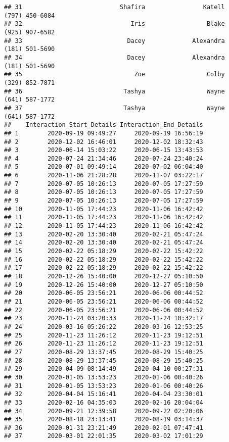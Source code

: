 \documentclass[
]{article}
\begin{document}
\begin{verbatim}
## 31                           Shafira                Katell       (797) 450-6084
## 32                              Iris                 Blake       (925) 907-6582
## 33                             Dacey             Alexandra       (181) 501-5690
## 34                             Dacey             Alexandra       (181) 501-5690
## 35                               Zoe                 Colby       (329) 852-7871
## 36                            Tashya                 Wayne       (641) 587-1772
## 37                            Tashya                 Wayne       (641) 587-1772
##    Interaction_Start_Details Interaction_End_Details
## 1        2020-09-19 09:49:27     2020-09-19 16:56:19
## 2        2020-12-02 16:46:01     2020-12-02 18:32:43
## 3        2020-06-14 15:03:22     2020-06-15 13:43:53
## 4        2020-07-24 21:34:46     2020-07-24 23:40:24
## 5        2020-07-01 09:49:14     2020-07-02 06:04:40
## 6        2020-11-06 21:28:28     2020-11-07 03:22:17
## 7        2020-07-05 10:26:13     2020-07-05 17:27:59
## 8        2020-07-05 10:26:13     2020-07-05 17:27:59
## 9        2020-07-05 10:26:13     2020-07-05 17:27:59
## 10       2020-11-05 17:44:23     2020-11-06 16:42:42
## 11       2020-11-05 17:44:23     2020-11-06 16:42:42
## 12       2020-11-05 17:44:23     2020-11-06 16:42:42
## 13       2020-02-20 13:30:40     2020-02-21 05:47:24
## 14       2020-02-20 13:30:40     2020-02-21 05:47:24
## 15       2020-02-22 05:18:29     2020-02-22 15:42:22
## 16       2020-02-22 05:18:29     2020-02-22 15:42:22
## 17       2020-02-22 05:18:29     2020-02-22 15:42:22
## 18       2020-12-26 15:40:00     2020-12-27 05:10:50
## 19       2020-12-26 15:40:00     2020-12-27 05:10:50
## 20       2020-06-05 23:56:21     2020-06-06 00:44:52
## 21       2020-06-05 23:56:21     2020-06-06 00:44:52
## 22       2020-06-05 23:56:21     2020-06-06 00:44:52
## 23       2020-11-24 03:20:33     2020-11-24 10:32:17
## 24       2020-03-16 05:26:22     2020-03-16 12:53:25
## 25       2020-11-23 11:26:12     2020-11-23 19:12:51
## 26       2020-11-23 11:26:12     2020-11-23 19:12:51
## 27       2020-08-29 13:37:45     2020-08-29 15:40:25
## 28       2020-08-29 13:37:45     2020-08-29 15:40:25
## 29       2020-04-09 08:14:49     2020-04-10 00:27:31
## 30       2020-01-05 13:53:23     2020-01-06 00:40:26
## 31       2020-01-05 13:53:23     2020-01-06 00:40:26
## 32       2020-04-04 15:16:41     2020-04-04 23:30:01
## 33       2020-02-16 04:35:03     2020-02-16 20:04:04
## 34       2020-09-21 12:39:58     2020-09-22 02:20:06
## 35       2020-08-18 23:13:41     2020-08-19 03:14:37
## 36       2020-01-31 23:21:49     2020-02-01 07:47:41
## 37       2020-03-01 22:01:35     2020-03-02 17:01:29
\end{verbatim}
\end{document}
